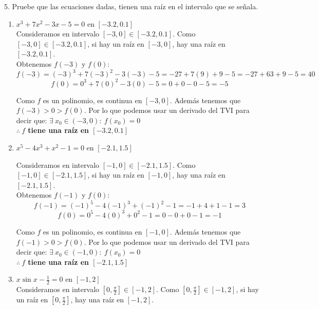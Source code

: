 \documentclass[12pt]{article}
\begin{document}
5. Pruebe que las ecuaciones dadas, tienen una raíz en el intervalo que se señala.

\begin{enumerate}[\hspace{9px} a)]
    \item \(x^3+7x^2-3x-5=0\) en $[-3.2,0.1]$\\

        Consideramos en intervalo $[-3,0] \in [-3.2,0.1]$. Como $[-3,0] \in [-3.2,0.1]$, si hay un raíz en $[-3,0]$, hay una raíz en $[-3.2,0.1]$.\\

        Obtenemos $f(-3)$ y $f(0)$:
        \[f(-3)=(-3)^3+7(-3)^2-3(-3)-5=-27+7(9)+9-5=-27+63+9-5=40\]
        \[f(0)=0^3+7(0)^2-3(0)-5=0+0-0-5=-5\]

        Como $f$ es un polinomio, es continua en $[-3,0]$. Además tenemos que $f(-3)>0>f(0)$. Por lo que podemos usar un derivado del TVI para decir que: \(\exists \ x_0 \in (-3,0) : \ f(x_0)=0\)\\

        \textbf{ $\therefore \ f$ tiene una raíz en $[-3.2,0.1]$}\\
    \item \(x^5-4x^3+x^2-1=0\) en $[-2.1,1.5]$

        Consideramos en intervalo $[-1,0] \in [-2.1,1.5]$. Como $[-1,0] \in [-2.1,1.5]$, si hay un raíz en $[-1,0]$, hay una raíz en $[-2.1,1.5]$.\\

        Obtenemos $f(-1)$ y $f(0)$:
        \[f(-1)=(-1)^5-4(-1)^3+(-1)^2-1=-1+4+1-1=3\]
        \[f(0)=0^5-4(0)^3+0^2-1=0-0+0-1=-1\]

        Como $f$ es un polinomio, es continua en $[-1,0]$. Además tenemos que $f(-1)>0>f(0)$. Por lo que podemos usar un derivado del TVI para decir que: \(\exists \ x_0 \in (-1,0) : \ f(x_0)=0\)\\

        \textbf{ $\therefore \ f$ tiene una raíz en $[-2.1,1.5]$}\\
    \item \(x\sin x-\displaystyle\frac{1}{2}=0\) en $[-1,2]$\\

        Consideramos en intervalo $[0,\frac{\pi}{2}] \in [-1,2]$. Como $[0,\frac{\pi}{2}] \in [-1,2]$, si hay un raíz en $[0,\frac{\pi}{2}]$, hay una raíz en $[-1,2]$.\\


\end{enumerate}
\end{document}
